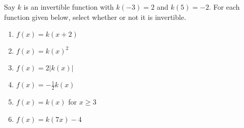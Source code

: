 \documentclass{ximera}
\author{Kenneth Berglund}
\begin{document}
\begin{exercise}
Say $k$ is an invertible function with $k(-3) = 2$ and $k(5) = -2$. For each function given below, select whether or not it is invertible.
\begin{enumerate}
\item $f(x) = k(x + 2)$ 
\begin{multipleChoice}  
\end{multipleChoice} 

\item $f(x) = k(x)^2$ 
\begin{multipleChoice}  
\end{multipleChoice} 

\item $f(x) = 2|k(x)|$ 
\begin{multipleChoice}  
\end{multipleChoice} 

\item $f(x) = -\frac{1}{2}k(x)$ 
\begin{multipleChoice}  
\end{multipleChoice} 

\item $f(x) = k(x)$ for $x \ge 3$ 
\begin{multipleChoice}  
\end{multipleChoice} 

\item $f(x) = k(7x) -4$ 
\begin{multipleChoice}  
\end{multipleChoice} 
\end{enumerate}
\end{exercise}
\end{document}

